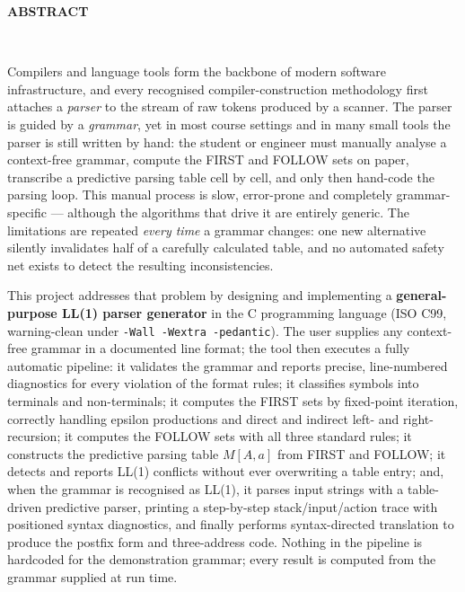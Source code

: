 \documentclass[12pt,a4paper,oneside,openany]{report}
\newcommand{\pmpage}[1]{%
  \clearpage\thispagestyle{fancy}%
  \begin{center}\bfseries\fontsize{14}{18}\selectfont #1\end{center}%
  \vspace{0.6em}}
\begin{document}
\pmpage{ABSTRACT}
~\vspace{0.3em}

Compilers and language tools form the backbone of modern software
infrastructure, and every recognised compiler-construction methodology first
attaches a \emph{parser} to the stream of raw tokens produced by a scanner.
The parser is guided by a \emph{grammar}, yet in most course settings and in
many small tools the parser is still written by hand: the student or engineer
must manually analyse a context-free grammar, compute the FIRST and FOLLOW
sets on paper, transcribe a predictive parsing table cell by cell, and only
then hand-code the parsing loop. This manual process is slow, error-prone and
completely grammar-specific --- although the algorithms that drive it are
entirely generic. The limitations are repeated \emph{every time} a grammar
changes: one new alternative silently invalidates half of a carefully
calculated table, and no automated safety net exists to detect the resulting
inconsistencies.

This project addresses that problem by designing and implementing a
\textbf{general-purpose LL(1) parser generator} in the C programming language
(ISO C99, warning-clean under \texttt{-Wall -Wextra -pedantic}). The user
supplies any context-free grammar in a documented line format; the tool then
executes a fully automatic pipeline: it validates the grammar and reports
precise, line-numbered diagnostics for every violation of the format rules;
it classifies symbols into terminals and non-terminals; it computes the FIRST
sets by fixed-point iteration, correctly handling epsilon productions and
direct and indirect left- and right-recursion; it computes the FOLLOW sets
with all three standard rules; it constructs the predictive parsing table
$M[A,a]$ from FIRST and FOLLOW; it detects and reports LL(1) conflicts without
ever overwriting a table entry; and, when the grammar is recognised as LL(1),
it parses input strings with a table-driven predictive parser, printing a
step-by-step stack/input/action trace with positioned syntax diagnostics, and
finally performs syntax-directed translation to produce the postfix form and
three-address code. Nothing in the pipeline is hardcoded for the
demonstration grammar; every result is computed from the grammar supplied at
run time.
\end{document}
